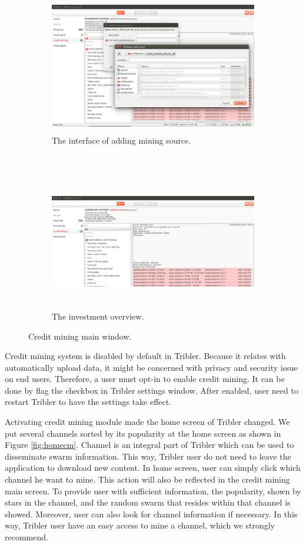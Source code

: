 \begin{figure}[t!]
	\begin{adjustwidth}{-2.5cm}{}
		\begin{subfigure}[t]{0.6\textwidth}
			\centering
			\includegraphics[width=\textwidth, height=6cm]{pics/add_source.png}
			\caption{The interface of adding mining source.}
			\label{fig:addsource}
		\end{subfigure}
		~
		\begin{subfigure}[t]{0.8\textwidth}
			\centering
			\includegraphics[width=\textwidth, height=6cm]{pics/overview_result.png}
			\caption{The investment overview.}
			\label{fig:overview}
		\end{subfigure}
		\caption{Credit mining main window.}
	\end{adjustwidth}
\end{figure}

Credit mining system is disabled by default in Tribler. Because it relates with automatically upload data, it might be concerned with privacy and security issue on end users. Therefore, a user must opt-in to enable credit mining. It can be done by flag the checkbox in Tribler settings window. After enabled, user need to restart Tribler to have the settings take effect. 

Activating credit mining module made the home screen of Tribler changed. We put several channels sorted by its popularity at the home screen as shown in Figure \ref{fig:homecm}. Channel is an integral part of Tribler which can be used to disseminate swarm information. This way, Tribler user do not need to leave the application to download new content. In home screen, user can simply click which channel he want to mine. This action will also be reflected in the credit mining main screen. To provide user with sufficient information, the popularity, shown by stars in the channel, and the random swarm that resides within that channel is showed. Moreover, user can also look for channel information if necessary. In this way, Tribler user have an easy access to mine a channel, which we strongly recommend.

